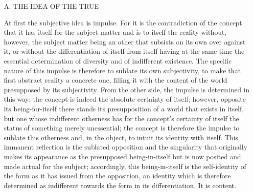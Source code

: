 
A. THE IDEA OF THE TRUE

At first the subjective idea is impulse.
For it is the contradiction of the concept
that it has itself for the subject matter
and is to itself the reality without, however,
the subject matter being an other that subsists
on its own over against it,
or without the differentiation
of itself from itself
having at the same time
the essential determination of diversity
and of indifferent existence.
The specific nature of this impulse is therefore
to sublate its own subjectivity,
to make that first abstract reality a concrete one,
filling it with the content of the world
presupposed by its subjectivity.
From the other side, the impulse is determined in this way:
the concept is indeed the absolute certainty of itself;
however, opposite its being-for-itself
there stands its presupposition of a world
that exists in itself,
but one whose indifferent otherness
has for the concept's certainty of itself
the status of something merely unessential;
the concept is therefore the impulse
to sublate this otherness
and, in the object, to intuit
its identity with itself.
This immanent reflection is
the sublated opposition
and the singularity that originally
makes its appearance as
the presupposed being-in-itself
but is now posited and made actual for the subject;
accordingly, this being-in-itself is
the self-identity of the form
as it has issued from the opposition,
an identity which is therefore determined as
indifferent towards the form
in its differentiation.
It is content.

